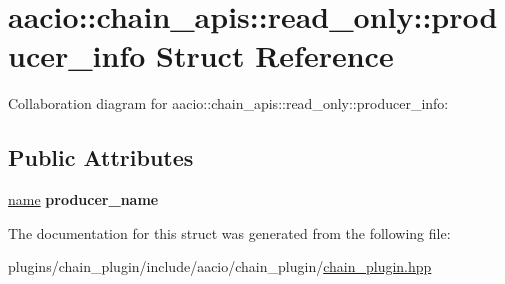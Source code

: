 \hypertarget{structaacio_1_1chain__apis_1_1read__only_1_1producer__info}{}\section{aacio\+:\+:chain\+\_\+apis\+:\+:read\+\_\+only\+:\+:producer\+\_\+info Struct Reference}
\label{structaacio_1_1chain__apis_1_1read__only_1_1producer__info}


Collaboration diagram for aacio\+:\+:chain\+\_\+apis\+:\+:read\+\_\+only\+:\+:producer\+\_\+info\+:
\subsection*{Public Attributes}
\begin{DoxyCompactItemize}
\item 
\mbox{\label{structaacio_1_1chain__apis_1_1read__only_1_1producer__info_aae4ad24af805ca62db2ec2c9f8a1f90a}} 
\mbox{\hyperlink{structaacio_1_1name}{name}} {\bfseries producer\+\_\+name}
\end{DoxyCompactItemize}


The documentation for this struct was generated from the following file\+:\begin{DoxyCompactItemize}
\item 
plugins/chain\+\_\+plugin/include/aacio/chain\+\_\+plugin/\mbox{\hyperlink{chain__plugin_8hpp}{chain\+\_\+plugin.\+hpp}}\end{DoxyCompactItemize}
